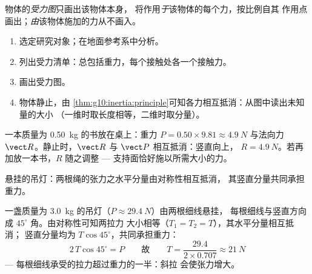 \begin{definition}[受力图]\label{def:g10:inertia:diagram}
物体的\emph{受力图}只画出该物体本身，
将作用\emph{于}该物体的每个力，按比例自其
作用点画出；\emph{由}该物体施加的力从不画入。
\end{definition}

\begin{method}[分析静止情形]\label{met:g10:inertia:method}
\begin{enumerate}
  \item 选定研究对象；在地面参考系中分析。
  \item 列出受力清单：总包括重力，每个接触处各一个接触力。
  \item 画出受力图。
  \item 物体静止，由
        \cref{thm:g10:inertia:principle}可知各力相互抵消：从图中读出未知量的大小
        （一维时取长度相等，二维时取分量）。
\end{enumerate}
\end{method}

\begin{example}[桌上的书]\label{ex:g10:inertia:book}
一本质量为 \qty{0.50}{kg} 的书放在桌上：重力
$P = 0.50 \times 9.81 \approx \qty{4.9}{N}$ 与法向力
$\vect R$。静止时，$\vect R$ 与 $\vect P$ 相互抵消：竖直向上，
$R = \qty{4.9}{N}$。若再加放一本书，$R$ 随之调整 ---
支持面恰好施以所需大小的力。
\end{example}

\begin{omfigure}

{\small 悬挂的吊灯：两根绳的张力之水平分量由对称性相互抵消，
其竖直分量共同承担重力。}
\end{omfigure}

\begin{example}[两根细线上的吊灯]\label{ex:g10:inertia:lamp}
一盏质量为 \qty{3.0}{kg} 的吊灯（$P \approx \qty{29.4}{N}$）由两根细线悬挂，
每根细线与竖直方向成 $45^\circ$ 角。由对称性可知两拉力
大小相等（$T_1 = T_2 = T$），其水平分量相互抵消；
竖直分量均为 $T \cos 45^\circ$，共同承担重力：
\[
2\,T \cos 45^\circ = P
\qquad\text{故}\qquad
T = \frac{29.4}{2 \times 0.707} \approx \qty{21}{N}
\]
--- 每根细线承受的拉力超过重力的一半：斜拉
会使张力增大。
\end{example}

